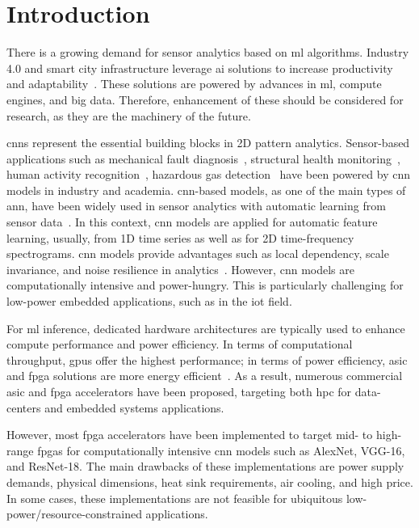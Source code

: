 
\section{Introduction}
\label{sec:introduction}
There is a growing demand for sensor analytics based on \gls{ml} algorithms. Industry 4.0 and smart city infrastructure leverage \gls{ai} solutions to increase productivity and adaptability~\cite{lom2016industry}. These solutions are powered by advances in \gls{ml}, compute engines, and big data. Therefore, enhancement of these should be considered for research, as they are the machinery of the future.

\glspl{cnn} represent the essential building blocks in 2D pattern analytics. Sensor-based applications such as mechanical fault diagnosis~\cite{li2019sensor,dong2018rolling}, structural health monitoring~\cite{nagayama2007structural}, human activity recognition~\cite{wang2019deep}, hazardous gas detection~\cite{kim2017hazardous} have been powered by \gls{cnn} models in industry and academia. \gls{cnn}-based models, as one of the main types of \gls{ann}, have been widely used in sensor analytics with automatic learning from sensor data~\cite{ince2016real, janssens2016convolutional, abdeljaber2017real, guo2016hierarchical}. In this context, \gls{cnn} models are applied for automatic feature learning, usually, from 1D time series as well as for 2D time-frequency spectrograms. \gls{cnn} models provide advantages such as local dependency, scale invariance, and noise resilience in analytics~\cite{du2014leveraging}. However, \gls{cnn} models are computationally intensive and power-hungry. This is particularly challenging for low-power embedded applications, such as in the \gls{iot} field.

For \gls{ml} inference, dedicated hardware architectures are typically used to enhance compute performance and power efficiency. In terms of computational throughput, \glspl{gpu} offer the highest performance; in terms of power efficiency, \gls{asic} and \gls{fpga} solutions are more energy efficient~\cite{nurvitadhi2017can}. As a result, numerous commercial \gls{asic} and \gls{fpga} accelerators have been proposed, targeting both \gls{hpc} for data-centers and embedded systems applications.

However, most \gls{fpga} accelerators have been implemented to target mid- to high-range \glspl{fpga} for computationally intensive \gls{cnn} models such as AlexNet, VGG-16, and ResNet-18. The main drawbacks of these implementations are power supply demands, physical dimensions, heat sink requirements, air cooling, and high price. In some cases, these implementations are not feasible for ubiquitous low-power/resource-constrained applications.

